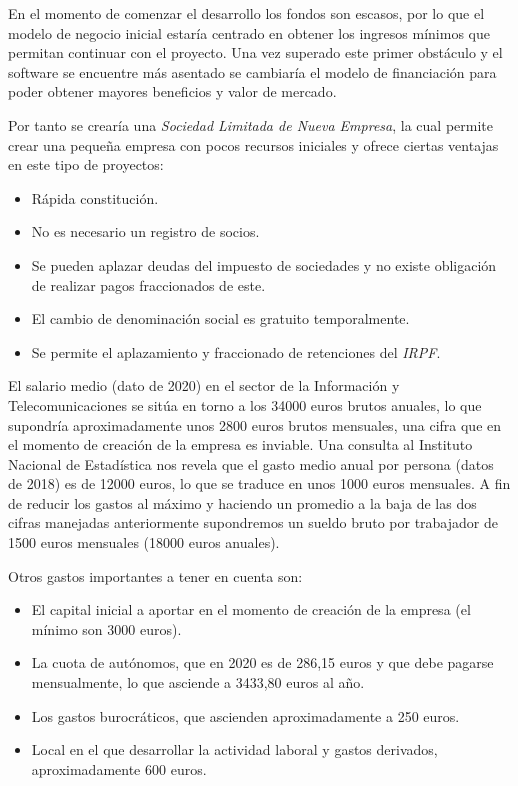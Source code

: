 En el momento de comenzar el desarrollo los fondos son escasos, por lo que el modelo de negocio inicial estaría centrado en obtener los ingresos mínimos que permitan continuar con el proyecto. Una vez superado este primer obstáculo y el software se encuentre más asentado se cambiaría el modelo de financiación para poder obtener mayores beneficios y valor de mercado.

Por tanto se crearía una \textit{Sociedad Limitada de Nueva Empresa}, la cual permite crear una pequeña empresa con pocos recursos iniciales y ofrece ciertas ventajas en este tipo de proyectos:

\begin{itemize}
	\item Rápida constitución.
	\item No es necesario un registro de socios.
	\item Se pueden aplazar deudas del impuesto de sociedades y no existe obligación de realizar pagos fraccionados de este.
	\item El cambio de denominación social es gratuito temporalmente.
	\item Se permite el aplazamiento y fraccionado de retenciones del \textit{IRPF}.
\end{itemize}

El salario medio (dato de 2020) en el sector de la Información y Telecomunicaciones se sitúa en torno a los 34000 euros brutos anuales, lo que supondría aproximadamente unos 2800 euros brutos mensuales, una cifra que en el momento de creación de la empresa es inviable. Una consulta al Instituto Nacional de Estadística nos revela que el gasto medio anual por persona (datos de 2018) es de 12000 euros, lo que se traduce en unos 1000 euros mensuales. A fin de reducir los gastos al máximo y haciendo un promedio a la baja de las dos cifras manejadas anteriormente supondremos un sueldo bruto por trabajador de 1500 euros mensuales (18000 euros anuales).

\bigskip
Otros gastos importantes a tener en cuenta son:
\begin{itemize}
	\item El capital inicial a aportar en el momento de creación de la empresa (el mínimo son 3000 euros).
	\item La cuota de autónomos, que en 2020 es de 286,15 euros y que debe pagarse mensualmente, lo que asciende a 3433,80 euros al año.
	\item Los gastos burocráticos, que ascienden aproximadamente a 250 euros.
	\item Local en el que desarrollar la actividad laboral y gastos derivados, aproximadamente 600 euros. 
\end{itemize}

